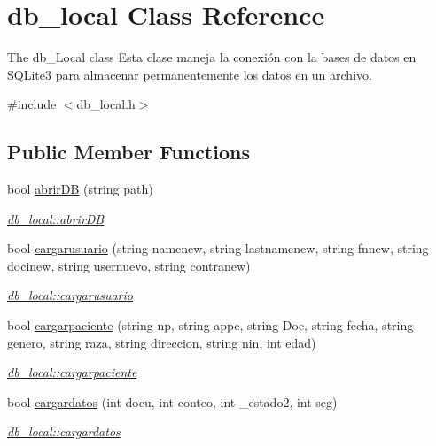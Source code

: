 \hypertarget{classdb__local}{}\section{db\+\_\+local Class Reference}
\label{classdb__local}


The db\+\_\+\+Local class Esta clase maneja la conexión con la bases de datos en S\+Q\+Lite3 para almacenar permanentemente los datos en un archivo.  




{\ttfamily \#include $<$db\+\_\+local.\+h$>$}

\subsection*{Public Member Functions}
\begin{DoxyCompactItemize}
\item 
bool \hyperlink{classdb__local_a64ad8edee1a11c82f5d96bfd10a5fdd3}{abrir\+DB} (string path)
\begin{DoxyCompactList}\small\item\em \hyperlink{classdb__local_a64ad8edee1a11c82f5d96bfd10a5fdd3}{db\+\_\+local\+::abrir\+DB} \end{DoxyCompactList}\item 
bool \hyperlink{classdb__local_a4f93f54ed2cacb6d8c1da7b2039f5ff3}{cargarusuario} (string namenew, string lastnamenew, string fnnew, string docinew, string usernuevo, string contranew)
\begin{DoxyCompactList}\small\item\em \hyperlink{classdb__local_a4f93f54ed2cacb6d8c1da7b2039f5ff3}{db\+\_\+local\+::cargarusuario} \end{DoxyCompactList}\item 
bool \hyperlink{classdb__local_ad208904f698ad775e2a14f9f0220d251}{cargarpaciente} (string np, string appc, string Doc, string fecha, string genero, string raza, string direccion, string nin, int edad)
\begin{DoxyCompactList}\small\item\em \hyperlink{classdb__local_ad208904f698ad775e2a14f9f0220d251}{db\+\_\+local\+::cargarpaciente} \end{DoxyCompactList}\item 
bool \hyperlink{classdb__local_abfb0cb98687cd548429b15e537fbaf2f}{cargardatos} (int docu, int conteo, int \+\_\+estado2, int seg)
\begin{DoxyCompactList}\small\item\em \hyperlink{classdb__local_abfb0cb98687cd548429b15e537fbaf2f}{db\+\_\+local\+::cargardatos} \end{DoxyCompactList}\item 

\end{DoxyCompactItemize}
